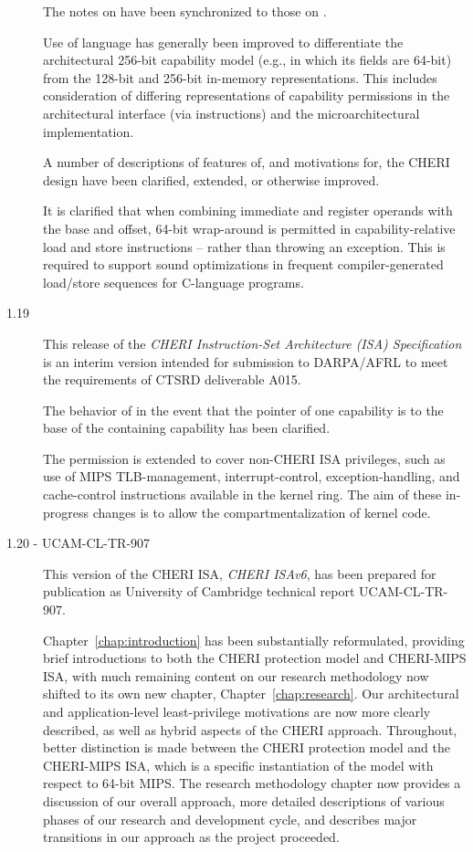 \begin{description}
  The notes on  have been synchronized to those on
  .

  Use of language has generally been improved to differentiate the
  architectural 256-bit capability model (e.g., in which its fields are
  64-bit) from the 128-bit and 256-bit in-memory representations.
  This includes consideration of differing representations of capability
  permissions in the architectural interface (via instructions) and the
  microarchitectural implementation.

  A number of descriptions of features of, and motivations for, the CHERI design
  have been clarified, extended, or otherwise improved.

  It is clarified that when combining immediate and register operands with
  the base and offset, 64-bit wrap-around is permitted in capability-relative
  load and store instructions -- rather than throwing an exception.
  This is required to support sound optimizations in frequent
  compiler-generated load/store sequences for C-language programs.

\item[1.19] This release of the \textit{CHERI Instruction-Set Architecture
  (ISA) Specification} is an interim version intended for submission to
  DARPA/AFRL to meet the requirements of CTSRD deliverable A015.

  The behavior of  in the event that the pointer of one
  capability is to the base of the containing capability has been clarified.

  The \cappermASR permission is extended to cover non-CHERI ISA
  privileges, such as use of MIPS TLB-management, interrupt-control,
  exception-handling, and cache-control instructions available in the kernel
  ring.
  The aim of these in-progress changes is to allow the compartmentalization of
  kernel code.

\item[1.20 - UCAM-CL-TR-907] This version of the CHERI ISA, \textit{CHERI
  ISAv6}, has been prepared for publication as University of Cambridge
  technical report UCAM-CL-TR-907.

  Chapter~\ref{chap:introduction} has been substantially reformulated,
  providing brief introductions to both the CHERI protection model and
  CHERI-MIPS ISA, with much remaining content on our research methodology now
  shifted to its own new chapter, Chapter~\ref{chap:research}.
  Our architectural and application-level least-privilege motivations are now
  more clearly described, as well as hybrid aspects of the CHERI approach.
  Throughout, better distinction is made between the CHERI protection model and
  the CHERI-MIPS ISA, which is a specific instantiation of the model with
  respect to 64-bit MIPS.
  The research methodology chapter now provides a discussion of our overall
  approach, more detailed descriptions of various phases of our research and
  development cycle, and describes major transitions in our approach as the
  project proceeded.


\end{description}
